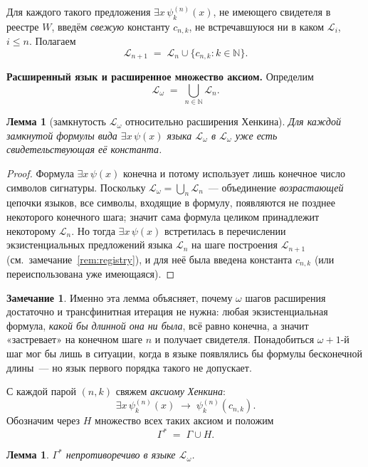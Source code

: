 \documentclass[12pt, a4paper]{article}
\theoremstyle{plain}
\newtheorem{lemma}[theorem]{Лемма}
\theoremstyle{definition}
\newtheorem{remark}[theorem]{Замечание}
\newcommand{\Lang}{\mathcal{L}}
\newcommand{\Lw}{\mathcal{L}_\omega}
\newcommand{\N}{\mathbb{N}}
\begin{document}
Для каждого такого предложения $\exists x\,\psi_k^{(n)}(x)$, не имеющего
свидетеля в реестре $W$, введём \emph{свежую} константу $c_{n,k}$,
не встречавшуюся ни в каком $\Lang_i$, $i \le n$. Полагаем
\[
  \Lang_{n+1} \;=\; \Lang_n \cup \bigl\{c_{n,k} : k \in \N\bigr\}.
\]

\textbf{Расширенный язык и расширенное множество аксиом.}
Определим
\[
  \Lw \;=\; \bigcup_{n \in \N} \Lang_n.
\]

\begin{lemma}[замкнутость $\Lw$ относительно расширения Хенкина]\label{lem:omega-closed}
Для каждой замкнутой формулы вида $\exists x\,\psi(x)$ языка $\Lw$ в $\Lw$
уже есть свидетельствующая её константа.
\end{lemma}

\begin{proof}
Формула $\exists x\,\psi(x)$ конечна и потому использует лишь конечное
число символов сигнатуры. Поскольку $\Lw = \bigcup_n \Lang_n$~--- объединение
\emph{возрастающей} цепочки языков, все символы, входящие в формулу,
появляются не позднее некоторого конечного шага; значит сама формула
целиком принадлежит некоторому $\Lang_n$. Но тогда $\exists x\,\psi(x)$
встретилась в перечислении экзистенциальных предложений языка $\Lang_n$
на шаге построения $\Lang_{n+1}$ (см.\ замечание~\ref{rem:registry}),
и для неё была введена константа $c_{n,k}$ (или переиспользована уже
имеющаяся).
\end{proof}

\begin{remark}
Именно эта лемма объясняет, почему $\omega$ шагов расширения достаточно
и трансфинитная итерация не нужна: любая экзистенциальная формула,
\emph{какой бы длинной она ни была}, всё равно конечна, а значит
«застревает» на конечном шаге $n$ и получает свидетеля. Понадобиться
$\omega+1$-й шаг мог бы лишь в ситуации, когда в языке появлялись бы
формулы бесконечной длины~--- но язык первого порядка такого не допускает.
\end{remark}

С каждой парой $(n, k)$ свяжем \emph{аксиому Хенкина}:
\[
  \exists x\,\psi_k^{(n)}(x) \;\to\; \psi_k^{(n)}(c_{n,k}).
\]
Обозначим через $H$ множество всех таких аксиом и положим
\[
  \Gamma^* \;=\; \Gamma \cup H.
\]

\begin{lemma}\label{lem:henkin-consistent}
$\Gamma^*$ непротиворечиво в языке $\Lw$.
\end{lemma}
\end{document}
